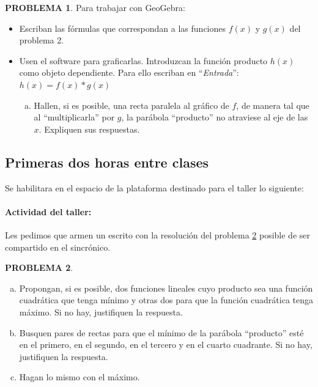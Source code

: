 \documentclass[oneside,spanish]{amsart}
\numberwithin{equation}{section}
\numberwithin{figure}{section}
\theoremstyle{definition}
\newtheorem{problema}{\normalfont PROBLEMA}
\begin{document}
\begin{problema}\label{prob:4}
Para trabajar con GeoGebra:

\begin{itemize}[-]
	\item Escriban las fórmulas que correspondan a las funciones $f(x)$ y $g(x)$ del problema 2.
	\item Usen el software para graficarlas. Introduzcan la función producto $h(x)$ como objeto dependiente. Para ello escriban en “\textit{Entrada}”: $h(x)=f(x)*g(x)$
	\begin{enumerate}[a.]
		\item Hallen, si es posible, una recta paralela al gráfico de $f$, de manera tal que al “multiplicarla” por $g$, la parábola “producto” no atraviese al eje de las $x$. Expliquen sus respuestas.
	\end{enumerate}
\end{itemize}
\end{problema}

\subsection{Primeras dos horas entre clases}\label{subsec:primeras-dos-EC}

Se habilitara en el espacio de la plataforma destinado para el taller lo siguiente:

\paragraph{Actividad del taller:}

Les pedimos que armen un escrito con la resolución del problema \ref{prob:5} posible de ser compartido en el sincrónico.

\begin{problema}\label{prob:5}

\begin{enumerate}[a.]
	\item  Propongan, si es posible, dos funciones lineales cuyo producto sea una función cuadrática que tenga mínimo y otras dos para que la función cuadrática tenga máximo. Si no hay, justifiquen la respuesta.
	\item Busquen pares de rectas para que el mínimo de la parábola “producto” esté en el primero, en el segundo, en el tercero y en el cuarto cuadrante. Si no hay, justifiquen la respuesta.
	\item Hagan lo mismo con el máximo.
\end{enumerate}
\end{problema}
\end{document}
